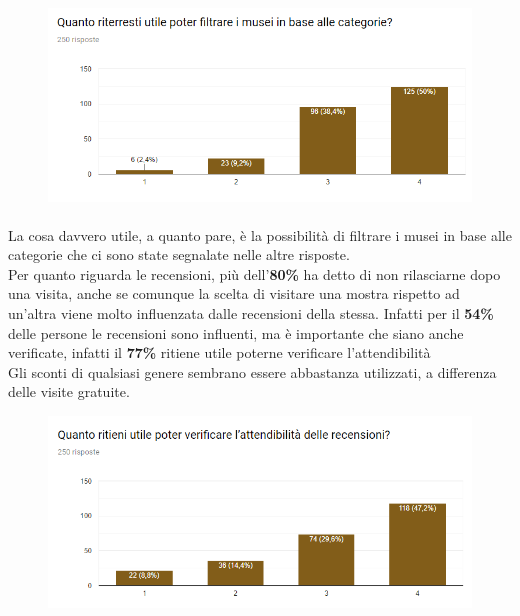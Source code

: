 \begin{figure}[ht]
    \centering
    \includegraphics[width=1.0\textwidth]{images/charts-questionario/chart-filtro-categorie.png}
\end{figure}

\paragraph{}
La cosa davvero utile, a quanto pare, è la possibilità di filtrare i musei in base alle categorie che ci sono state segnalate nelle altre risposte.\\
Per quanto riguarda le recensioni, più dell'\textbf{80\%} ha detto di non rilasciarne dopo una visita, anche se comunque la scelta di visitare una mostra rispetto ad un'altra viene molto influenzata dalle recensioni della stessa. Infatti per il \textbf{54\%} delle persone le recensioni sono influenti, ma è importante che siano anche verificate, infatti il \textbf{77\%} ritiene utile poterne verificare l'attendibilità\\
Gli sconti di qualsiasi genere sembrano essere abbastanza utilizzati, a differenza delle visite gratuite.

\begin{figure}[ht]
    \centering
    \includegraphics[width=1.0\textwidth]{images/charts-questionario/chart-verifica-recensioni.png}
\end{figure}